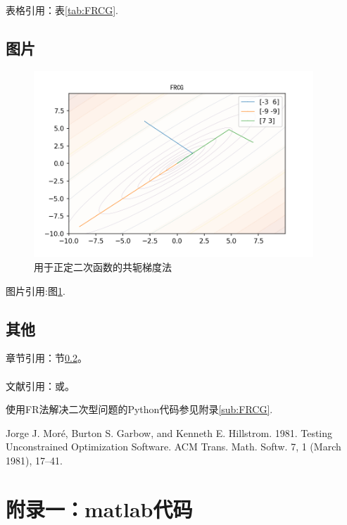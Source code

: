 \documentclass{zjgsureport}
\newcommand{\upcite}[1]{\textsuperscript{\textsuperscript{\cite{#1}}}}
\begin{document}
表格引用：表\ref{tab:FRCG}.



\subsection{图片} 

\begin{figure}[!htp]
 \centering
 \includegraphics[height=7cm]{images/FRCG.png}
 \caption{用于正定二次函数的共轭梯度法}
 \label{fig:FRCG}
\end{figure}

图片引用:图\ref{fig:FRCG}.



\subsection{其他} \label{else}

章节引用：节\ref{else}。

文献引用：\cite{Erdos01}或\upcite{Erdos01}。

使用FR法解决二次型问题的Python代码参见附录\ref{sub:FRCG}.




\newpage
\begin{thebibliography}{99}
    Jorge J. Moré, Burton S. Garbow, and Kenneth E. Hillstrom. 1981. Testing Unconstrained Optimization Software. ACM Trans. Math. Softw. 7, 1 (March 1981), 17–41. 
\end{thebibliography}




\appendix
\newpage
\section{附录一：matlab代码}
\end{document}
